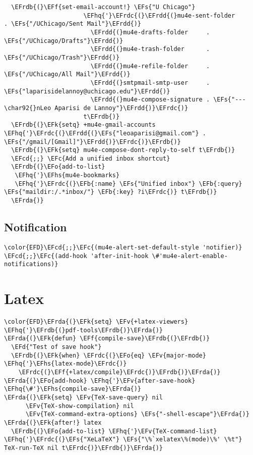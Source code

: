 \documentclass[12pt]{article}
\theoremstyle{plain}%
\theoremstyle{definition}
\theoremstyle{remark}
\newcommand{\EFc}[1]{\textcolor{EFc}{#1}} %
\newcommand{\EFcd}[1]{\textcolor{EFcd}{#1}} %
\newcommand{\EFs}[1]{\textcolor{EFs}{#1}} %
\newcommand{\EFd}[1]{\textcolor{EFd}{#1}} %
\newcommand{\EFk}[1]{\textcolor{EFk}{#1}} %
\newcommand{\EFb}[1]{\textcolor{EFb}{#1}} %
\newcommand{\EFf}[1]{\textcolor{EFf}{#1}} %
\newcommand{\EFv}[1]{\textcolor{EFv}{#1}} %
\newcommand{\EFo}[1]{\textcolor{EFo}{#1}} %
\newcommand{\EFhq}[1]{\textcolor{EFhq}{#1}} %
\newcommand{\EFhs}[1]{\textcolor{EFhs}{#1}} %
\newcommand{\EFrda}[1]{\textcolor{EFrda}{#1}} %
\newcommand{\EFrdb}[1]{\textcolor{EFrdb}{#1}} %
\newcommand{\EFrdc}[1]{\textcolor{EFrdc}{#1}} %
\newcommand{\EFrdd}[1]{\textcolor{EFrdd}{#1}} %
\begin{document}
\begin{Code}
\begin{Verbatim}
  \EFrdb{(}\EFf{set-email-account!} \EFs{"U Chicago"}
                      \EFhq{'}\EFrdc{(}\EFrdd{(}mu4e-sent-folder       . \EFs{"/UChicago/Sent Mail"}\EFrdd{)}
                        \EFrdd{(}mu4e-drafts-folder     . \EFs{"/UChicago/Drafts"}\EFrdd{)}
                        \EFrdd{(}mu4e-trash-folder      . \EFs{"/UChicago/Trash"}\EFrdd{)}
                        \EFrdd{(}mu4e-refile-folder     . \EFs{"/UChicago/All Mail"}\EFrdd{)}
                        \EFrdd{(}smtpmail-smtp-user     . \EFs{"laparisidelannoy@uchicago.edu"}\EFrdd{)}
                        \EFrdd{(}mu4e-compose-signature . \EFs{"---\char92{}nLeo Aparisi de Lannoy"}\EFrdd{)}\EFrdc{)}
                      t\EFrdb{)}
  \EFrdb{(}\EFk{setq} +mu4e-gmail-accounts \EFhq{'}\EFrdc{(}\EFrdd{(}\EFs{"leoaparisi@gmail.com"} . \EFs{"/gmail/[Gmail]"}\EFrdd{)}\EFrdc{)}\EFrdb{)}
  \EFrdb{(}\EFk{setq} mu4e-compose-dont-reply-to-self t\EFrdb{)}
  \EFcd{;;} \EFc{Add a unified inbox shortcut}
  \EFrdb{(}\EFo{add-to-list}
   \EFhq{'}\EFhs{mu4e-bookmarks}
   \EFhq{'}\EFrdc{(}\EFb{:name} \EFs{"Unified inbox"} \EFb{:query} \EFs{"maildir:/.*inbox/"} \EFb{:key} ?i\EFrdc{)} t\EFrdb{)}
  \EFrda{)}
\end{Verbatim}
\end{Code}
\subsection{Notification}
\label{sec:org9397f1e}
\begin{Code}
\begin{Verbatim}
\color{EFD}\EFcd{;;}\EFc{(mu4e-alert-set-default-style 'notifier)}
\EFcd{;;}\EFc{(add-hook 'after-init-hook \#'mu4e-alert-enable-notifications)}
\end{Verbatim}
\end{Code}
\section{Latex}
\label{sec:org943892f}
\begin{Code}
\begin{Verbatim}
\color{EFD}\EFrda{(}\EFk{setq} \EFv{+latex-viewers} \EFhq{'}\EFrdb{(}pdf-tools\EFrdb{)}\EFrda{)}
\EFrda{(}\EFk{defun} \EFf{compile-save}\EFrdb{(}\EFrdb{)}
  \EFd{"Test of save hook"}
  \EFrdb{(}\EFk{when} \EFrdc{(}\EFo{eq} \EFv{major-mode} \EFhq{'}\EFhs{latex-mode}\EFrdc{)}
    \EFrdc{(}\EFf{+latex/compile}\EFrdc{)}\EFrdb{)}\EFrda{)}
\EFrda{(}\EFo{add-hook} \EFhq{'}\EFv{after-save-hook} \EFhq{\#'}\EFhs{compile-save}\EFrda{)}
\EFrda{(}\EFk{setq} \EFv{TeX-save-query} nil
      \EFv{TeX-show-compilation} nil
      \EFv{TeX-command-extra-options} \EFs{"-shell-escape"}\EFrda{)}
\EFrda{(}\EFk{after!} latex
  \EFrdb{(}\EFo{add-to-list} \EFhq{'}\EFv{TeX-command-list} \EFhq{'}\EFrdc{(}\EFs{"XeLaTeX"} \EFs{"\%`xelatex\%(mode)\%' \%t"} TeX-run-TeX nil t\EFrdc{)}\EFrdb{)}\EFrda{)}
\end{Verbatim}
\end{Code}
\end{document}
